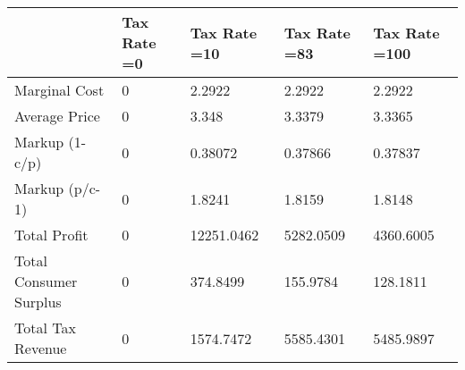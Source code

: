 \begin{tabular}{lllll}
& Tax Rate =0 & Tax Rate =10 & Tax Rate =83 & Tax Rate =100 \\ 
\hline 
Marginal Cost & 0 & 2.2922 & 2.2922 & 2.2922 \\ 
Average Price & 0 & 3.348 & 3.3379 & 3.3365 \\ 
Markup (1-c/p) & 0 & 0.38072 & 0.37866 & 0.37837 \\ 
Markup (p/c-1) & 0 & 1.8241 & 1.8159 & 1.8148 \\ 
Total Profit & 0 & 12251.0462 & 5282.0509 & 4360.6005 \\ 
Total Consumer Surplus & 0 & 374.8499 & 155.9784 & 128.1811 \\ 
Total Tax Revenue & 0 & 1574.7472 & 5585.4301 & 5485.9897 \\ 
\hline 
\end{tabular}